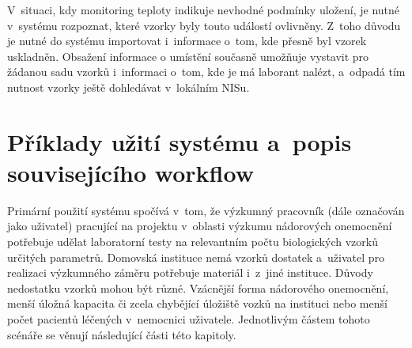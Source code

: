 \documentclass[11pt,draft,oneside]{fithesis2}
\begin{document}
V~situaci, kdy monitoring teploty indikuje nevhodné podmínky uložení, je nutné v~systému rozpoznat, které vzorky byly touto událostí ovlivněny. Z~toho důvodu je nutné do systému importovat i~informace o~tom, kde přesně byl vzorek uskladněn. Obsažení informace o umístění současně umožňuje vystavit pro žádanou sadu vzorků i~informaci o~tom, kde je má laborant nalézt, a~odpadá tím nutnost vzorky ještě dohledávat v~lokálním NISu.


\section{Příklady užití systému a~popis souvisejícího workflow}
Primární použití systému spočívá v~tom, že výzkumný pracovník (dále označován jako uživatel) pracující na projektu v~oblasti výzkumu nádorových onemocnění potřebuje udělat laboratorní testy na relevantním počtu biologických vzorků určitých parametrů. Domovská instituce nemá vzorků dostatek a~uživatel pro realizaci výzkumného záměru potřebuje materiál i~z~jiné instituce. Důvody nedostatku vzorků mohou být různé. Vzácnější forma nádorového onemocnění, menší úložná kapacita či zcela chybějící úložiště vozků na instituci nebo menší počet pacientů léčených v~nemocnici uživatele. Jednotlivým částem tohoto scénáře se věnují následující části této kapitoly.
\end{document}
